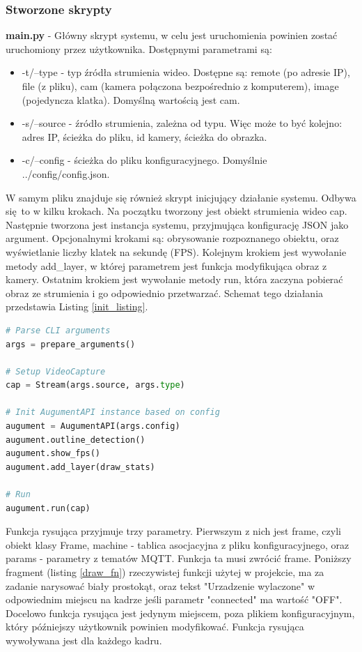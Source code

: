 \documentclass[12pt,twoside,polish]{article}
\begin{document}
\subsubsection*{Stworzone skrypty}
\textbf{main.py} - Główny skrypt systemu, w celu jest uruchomienia powinien zostać uruchomiony przez użytkownika. Dostępnymi parametrami są:
\begin{itemize}
	\item -t/--type - typ źródła strumienia wideo. Dostępne są: remote (po adresie IP), file (z pliku), cam (kamera połączona bezpośrednio z komputerem), image (pojedyncza klatka). Domyślną wartością jest cam.
	\item -s/--source - źródło strumienia, zależna od typu. Więc może to być kolejno: adres IP, ścieżka do pliku, id kamery, ścieżka do obrazka.
	\item -c/--config - ścieżka do pliku konfiguracyjnego. Domyślnie ../config/config.json.
\end{itemize}
W samym pliku znajduje się również skrypt inicjujący działanie systemu. Odbywa się to w kilku krokach. Na początku tworzony jest obiekt strumienia wideo cap. Następnie tworzona jest instancja systemu, przyjmująca konfigurację JSON jako argument. Opcjonalnymi krokami są: obrysowanie rozpoznanego obiektu, oraz wyświetlanie liczby klatek na sekundę (FPS). Kolejnym krokiem jest wywołanie metody add\_layer, w której parametrem jest funkcja modyfikująca obraz z kamery. Ostatnim krokiem jest wywołanie metody run, która zaczyna pobierać obraz ze strumienia i go odpowiednio przetwarzać. Schemat tego działania przedstawia Listing \ref{init_listing}.

\begin{lstlisting}[language=Python,caption=Uruchomienie systemu,label=init_listing]
# Parse CLI arguments
args = prepare_arguments()

# Setup VideoCapture
cap = Stream(args.source, args.type)

# Init AugumentAPI instance based on config
augument = AugumentAPI(args.config)
augument.outline_detection()
augument.show_fps()
augument.add_layer(draw_stats)

# Run 
augument.run(cap)
\end{lstlisting}

Funkcja rysująca przyjmuje trzy parametry. Pierwszym z nich jest frame, czyli obiekt klasy Frame, machine - tablica asocjacyjna z pliku konfiguracyjnego, oraz params - parametry z tematów MQTT. Funkcja ta musi zwrócić frame. Poniższy fragment (listing \ref{draw_fn}) rzeczywistej funkcji użytej w projekcie, ma za zadanie narysować biały prostokąt, oraz tekst "Urzadzenie wylaczone" w odpowiednim miejscu na kadrze jeśli parametr "connected" ma wartość "OFF". Docelowo funkcja rysująca jest jedynym miejscem, poza plikiem konfiguracyjnym, który późniejszy użytkownik powinien modyfikować. Funkcja rysująca wywoływana jest dla każdego kadru.
\end{document}
